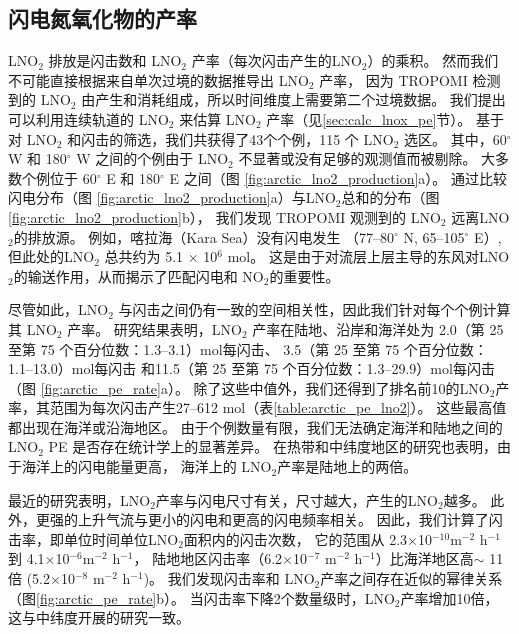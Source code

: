 \subsection{闪电氮氧化物的产率}

LNO$_2$ 排放是闪击数和 LNO$_2$ 产率（每次闪击产生的LNO$_2$）的乘积。
然而我们不可能直接根据来自单次过境的数据推导出 LNO$_2$ 产率，
因为 TROPOMI 检测到的 LNO$_2$ 由产生和消耗组成，所以时间维度上需要第二个过境数据。
我们提出可以利用连续轨道的 LNO$_2$ 来估算 LNO$_2$ 产率（见\ref{sec:calc_lnox_pe}节）。
基于对 LNO$_2$ 和闪击的筛选，我们共获得了43个个例，115 个 LNO$_2$ 选区。
其中，60$^{\circ}$ W 和 180$^{\circ}$ W 之间的个例由于 LNO$_2$ 不显著或没有足够的观测值而被剔除。
大多数个例位于 60$^{\circ}$ E 和 180$^{\circ}$ E 之间（图 \ref{fig:arctic_lno2_production}a）。
通过比较闪电分布（图 \ref{fig:arctic_lno2_production}a）与LNO$_2$总和的分布（图 \ref{fig:arctic_lno2_production}b），
我们发现 TROPOMI 观测到的 LNO$_2$ 远离LNO$_2$的排放源。
例如，喀拉海（Kara Sea）没有闪电发生 （77--80$^{\circ}$ N, 65--105$^{\circ}$ E）,
但此处的LNO$_2$ 总共约为 5.1 $\times$ 10$^6$ mol。
这是由于对流层上层主导的东风对LNO$_2$的输送作用，从而揭示了匹配闪电和 NO$_2$的重要性。

尽管如此，LNO$_2$ 与闪击之间仍有一致的空间相关性，因此我们针对每个个例计算其 LNO$_2$ 产率。
研究结果表明，LNO$_2$ 产率在陆地、沿岸和海洋处为 2.0（第 25 至第 75 个百分位数：1.3--3.1）mol每闪击、
3.5（第 25 至第 75 个百分位数：1.1--13.0）mol每闪击
和11.5（第 25 至第 75 个百分位数：1.3--29.9）mol每闪击（图 \ref{fig:arctic_pe_rate}a）。
除了这些中值外，我们还得到了排名前10的LNO$_2$产率，其范围为每次闪击产生27--612 mol（表\ref{table:arctic_pe_lno2}）。
这些最高值都出现在海洋或沿海地区。
由于个例数量有限，我们无法确定海洋和陆地之间的 LNO$_2$ PE 是否存在统计学上的显著差异。
在热带和中纬度地区的研究也表明，由于海洋上的闪电能量更高\citep{Beirle.2014,Hutchins.2013}，
海洋上的 LNO$_2$产率是陆地上的两倍\citep{Marais.2018,Allen.2019,Bucsela.2019}。

最近的研究表明，LNO$_2$产率与闪电尺寸有关，尺寸越大，产生的LNO$_2$越多\citep{Huntrieser.2008,Marais.2018}。
此外，更强的上升气流与更小的闪电和更高的闪电频率相关\citep{Bruning.2013,Bruning.2015,Mecikalski.2015}。
因此，我们计算了闪击率，即单位时间单位LNO$_2$面积内的闪击次数，
它的范围从 2.3$\times$10$^{-10} $m$^{-2}$ h$^{-1}$ 到 4.1$\times$10$^{-6} $m$^{-2 }$ h$^{-1}$，
陆地地区闪击率（6.2$\times$10$^{-7}$ m$^{-2}$ h$^{-1}$）比海洋地区高$\sim$ 11 倍 (5.2$\times$10$^{-8}$ m$^{-2}$ h$^{-1}$)。
我们发现闪击率和 LNO$_2$产率之间存在近似的幂律关系（图\ref{fig:arctic_pe_rate}b）。
当闪击率下降2个数量级时，LNO$_2$产率增加10倍，这与中纬度开展的研究一致\citep{Bucsela.2019,Zhang.2020b}。


